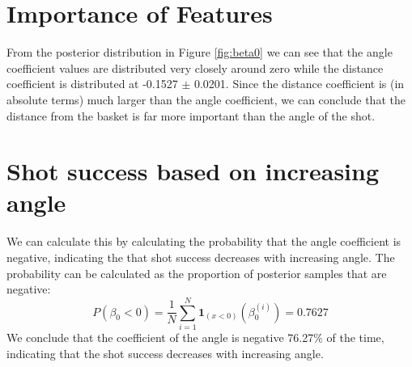 \documentclass[9pt]{IEEEtran}
\begin{document}
\section{Importance of Features}
From the posterior distribution in Figure \ref{fig:beta0} we can see that the angle coefficient values are distributed very closely around zero while the distance coefficient is distributed at -0.1527 $\pm$ 0.0201.
Since the distance coefficient is (in absolute terms) much larger than the angle coefficient, we can conclude that the distance from the basket is far more important than the angle of the shot.


\section{Shot success based on increasing angle}
We can calculate this by calculating the probability that the angle coefficient is negative, indicating the that shot success decreases with increasing angle.
The probability can be calculated as the proportion of posterior samples that are negative:
\begin{equation}
    P(\beta_0 < 0) = \frac{1}{N} \sum_{i=1}^{N} \mathbf{1}_{(x < 0)}(\beta_0^{(i)}) = 0.7627
\end{equation}
We conclude that the coefficient of the angle is negative 76.27\% of the time, indicating that the shot success decreases with increasing angle.





\end{document}
